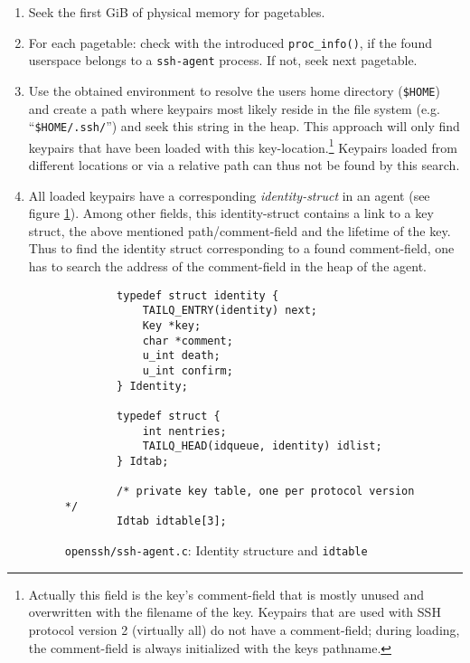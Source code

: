 \begin{enumerate}

	\item Seek the first GiB of physical memory for pagetables.

	\item For each pagetable: check with the introduced
		\texttt{proc\_info()}, if the found userspace belongs to a
		\texttt{ssh-agent} process. If not, seek next pagetable.

	\item Use the obtained environment to resolve the users home directory
		(\texttt{\$HOME}) and create a path where keypairs most likely
		reside in the file system (e.g\@. ``\texttt{\$HOME/.ssh/}'') and
		seek this string in the heap. This approach will only find
		keypairs that have been loaded with this
		key-location.\footnote{Actually this field is the key's
		comment-field that is mostly unused and overwritten with the
		filename of the key. Keypairs that are used with SSH protocol
		version 2 (virtually all) do not have a comment-field; during
		loading, the comment-field is always initialized with the keys
		pathname.} Keypairs loaded from different locations or via a
		relative path can thus not be found by this search.
	
	\item All loaded keypairs have a corresponding \emph{identity-struct} in
		an agent (see figure \ref{fig:code:identity-struct}). Among
		other fields, this identity-struct contains a link to a key
		struct, the above mentioned path/comment-field and the lifetime
		of the key. Thus to find the identity struct corresponding to a
		found comment-field, one has to search the address of the
		comment-field in the heap of the agent.

\lstset{language=C, numbers=left, numberstyle=\tiny, frame=lines}
\begin{figure}[h] \begin{center}
	\tiny
	\begin{lstlisting}
		typedef struct identity {
			TAILQ_ENTRY(identity) next;
			Key *key;
			char *comment;
			u_int death;
			u_int confirm;
		} Identity;

		typedef struct {
			int nentries;
			TAILQ_HEAD(idqueue, identity) idlist;
		} Idtab;

		/* private key table, one per protocol version */
		Idtab idtable[3];
	\end{lstlisting}
	\caption{\texttt{openssh/ssh-agent.c}: Identity structure and \texttt{idtable}}
	\label{fig:code:identity-struct}
\end{center}\end{figure}
	

\end{enumerate}
